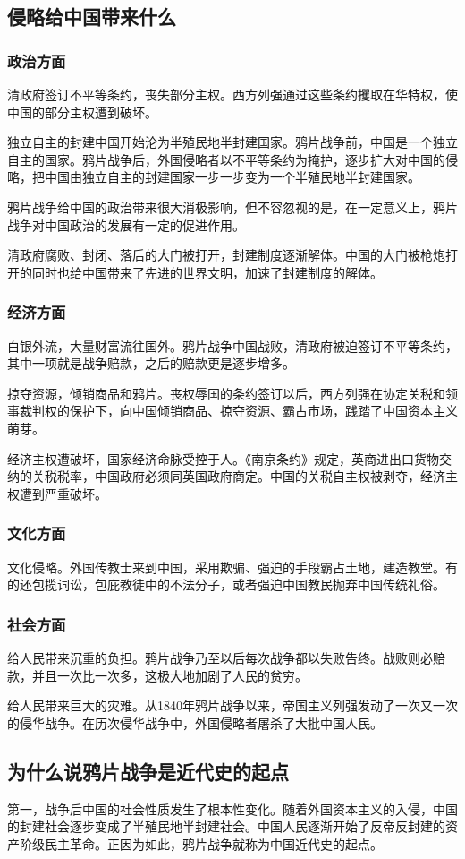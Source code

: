 \documentclass{article}
\begin{document}
\begin{CJK}{UTF8}{song}
\subsection{侵略给中国带来什么}
\subsubsection{政治方面}
清政府签订不平等条约，丧失部分主权。西方列强通过这些条约攫取在华特权，使中国的部分主权遭到破坏。

独立自主的封建中国开始沦为半殖民地半封建国家。鸦片战争前，中国是一个独立自主的国家。鸦片战争后，外国侵略者以不平等条约为掩护，逐步扩大对中国的侵略，把中国由独立自主的封建国家一步一步变为一个半殖民地半封建国家。

鸦片战争给中国的政治带来很大消极影响，但不容忽视的是，在一定意义上，鸦片战争对中国政治的发展有一定的促进作用。

清政府腐败、封闭、落后的大门被打开，封建制度逐渐解体。中国的大门被枪炮打开的同时也给中国带来了先进的世界文明，加速了封建制度的解体。
\subsubsection{经济方面}
白银外流，大量财富流往国外。鸦片战争中国战败，清政府被迫签订不平等条约，其中一项就是战争赔款，之后的赔款更是逐步增多。

掠夺资源，倾销商品和鸦片。丧权辱国的条约签订以后，西方列强在协定关税和领事裁判权的保护下，向中国倾销商品、掠夺资源、霸占市场，践踏了中国资本主义萌芽。

经济主权遭破坏，国家经济命脉受控于人。《南京条约》规定，英商进出口货物交纳的关税税率，中国政府必须同英国政府商定。中国的关税自主权被剥夺，经济主权遭到严重破坏。
\subsubsection{文化方面}
文化侵略。外国传教士来到中国，采用欺骗、强迫的手段霸占土地，建造教堂。有的还包揽词讼，包庇教徒中的不法分子，或者强迫中国教民抛弃中国传统礼俗。
\subsubsection{社会方面}
给人民带来沉重的负担。鸦片战争乃至以后每次战争都以失败告终。战败则必赔款，并且一次比一次多，这极大地加剧了人民的贫穷。

给人民带来巨大的灾难。从1840年鸦片战争以来，帝国主义列强发动了一次又一次的侵华战争。在历次侵华战争中，外国侵略者屠杀了大批中国人民。

\subsection{为什么说鸦片战争是近代史的起点}
第一，战争后中国的社会性质发生了根本性变化。随着外国资本主义的入侵，中国的封建社会逐步变成了半殖民地半封建社会。中国人民逐渐开始了反帝反封建的资产阶级民主革命。正因为如此，鸦片战争就称为中国近代史的起点。


\end{CJK}
\end{document}
